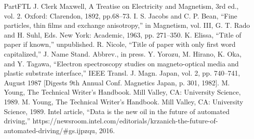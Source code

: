 \documentclass[conference]{IEEEtran}
\begin{document}
\begin{thebibliography}{00}

 PartFTL
 J. Clerk Maxwell, A Treatise on Electricity and Magnetism, 3rd ed., vol. 2. Oxford: Clarendon, 1892, pp.68--73.
 I. S. Jacobs and C. P. Bean, ``Fine particles, thin films and exchange anisotropy,'' in Magnetism, vol. III, G. T. Rado and H. Suhl, Eds. New York: Academic, 1963, pp. 271--350.
 K. Elissa, ``Title of paper if known,'' unpublished.
 R. Nicole, ``Title of paper with only first word capitalized,'' J. Name Stand. Abbrev., in press.
 Y. Yorozu, M. Hirano, K. Oka, and Y. Tagawa, ``Electron spectroscopy studies on magneto-optical media and plastic substrate interface,'' IEEE Transl. J. Magn. Japan, vol. 2, pp. 740--741, August 1987 [Digests 9th Annual Conf. Magnetics Japan, p. 301, 1982].
 M. Young, The Technical Writer's Handbook. Mill Valley, CA: University Science, 1989.
 M. Young, The Technical Writer's Handbook. Mill Valley, CA: University Science, 1989.
 Intel article, ``Data is the new oil in the future of automated driving,'' https://newsroom.intel.com/editorials/krzanich-the-future-of-automated-driving/\#gs.ijpzqu, 2016.
\end{thebibliography}
\end{document}
